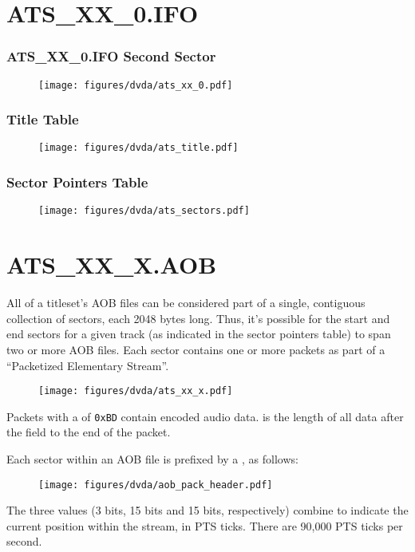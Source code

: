 \clearpage

\section{ATS\_XX\_0.IFO}
{
  
}

\clearpage

\subsubsection{ATS\_XX\_0.IFO Second Sector}
\begin{figure}[h]
\texttt{[image: figures/dvda/ats\_xx\_0.pdf]}
\end{figure}

\subsubsection{Title Table}
\begin{figure}[h]
  \texttt{[image: figures/dvda/ats\_title.pdf]}
\end{figure}

\subsubsection{Sector Pointers Table}
\begin{figure}[h]
  \texttt{[image: figures/dvda/ats\_sectors.pdf]}
\end{figure}

\clearpage

\section{ATS\_XX\_X.AOB}

All of a titleset's AOB files can be considered part of a
single, contiguous collection of sectors, each 2048 bytes long.
Thus, it's possible for the start and end sectors for a given track
(as indicated in the sector pointers table) to span two or more
AOB files.
Each sector contains one or more packets as part of a
``Packetized Elementary Stream''.

\begin{figure}[h]
  \texttt{[image: figures/dvda/ats\_xx\_x.pdf]}
\end{figure}
\par
\noindent
Packets with a  of \texttt{0xBD} contain encoded audio data.
 is the length of all data after
the  field to the end of the packet.
\par
\noindent
Each sector within an AOB file is prefixed by a ,
as follows:
\begin{figure}[h]
  \texttt{[image: figures/dvda/aob\_pack\_header.pdf]}
\end{figure}
\par
\noindent
The three  values (3 bits, 15 bits and 15 bits, respectively)
combine to indicate the current position within the stream, in PTS ticks.
There are 90,000 PTS ticks per second.


